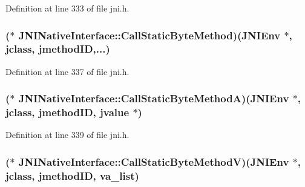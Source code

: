 Definition at line 333 of file jni.\-h.

\hypertarget{struct_j_n_i_native_interface_ae29c7741cf05f0b997df4713b93aefc1}{
\subsubsection[{Call\-Static\-Byte\-Method}]{($\ast$ J\-N\-I\-Native\-Interface\-::\-Call\-Static\-Byte\-Method)({\bf J\-N\-I\-Env} $\ast$, {\bf jclass}, {\bf jmethod\-I\-D},...)}}\label{struct_j_n_i_native_interface_ae29c7741cf05f0b997df4713b93aefc1}


Definition at line 337 of file jni.\-h.

\hypertarget{struct_j_n_i_native_interface_affb52df2ea9980686ba768e42dab49c2}{
\subsubsection[{Call\-Static\-Byte\-Method\-A}]{($\ast$ J\-N\-I\-Native\-Interface\-::\-Call\-Static\-Byte\-Method\-A)({\bf J\-N\-I\-Env} $\ast$, {\bf jclass}, {\bf jmethod\-I\-D}, {\bf jvalue} $\ast$)}}\label{struct_j_n_i_native_interface_affb52df2ea9980686ba768e42dab49c2}


Definition at line 339 of file jni.\-h.

\hypertarget{struct_j_n_i_native_interface_aeae61e131c58a8281192ae068d940db6}{
\subsubsection[{Call\-Static\-Byte\-Method\-V}]{($\ast$ J\-N\-I\-Native\-Interface\-::\-Call\-Static\-Byte\-Method\-V)({\bf J\-N\-I\-Env} $\ast$, {\bf jclass}, {\bf jmethod\-I\-D}, va\-\_\-list)}}\label{struct_j_n_i_native_interface_aeae61e131c58a8281192ae068d940db6}


